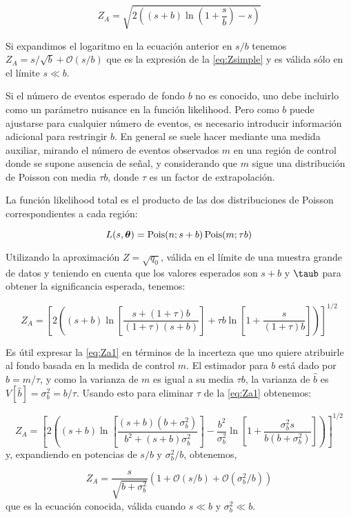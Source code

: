 \begin{equation}
  Z_A = \sqrt{2\left( (s+b) \ln \left( 1 + \frac{s}{b}\right) - s \right)}
  \label{eq:Z}
\end{equation}

Si expandimos el logaritmo en la ecuación anterior en $s/b$ tenemos $Z_A =
s/\sqrt{b} + \mathcal{O}(s/b)$ que es la expresión de la \cref{eq:Zsimple}
y es válida sólo en el límite $s \ll b$.

Si el número de eventos esperado de fondo $b$ no es conocido, uno debe incluirlo
como un parámetro nuisance en la función likelihood. Pero como $b$ puede
ajustarse para cualquier número de eventos, es necesario introducir información
adicional para restringir $b$. En general se suele hacer mediante una medida
auxiliar, mirando el número de eventos observados $m$ en una región de control
donde se supone ausencia de señal, y considerando que $m$ sigue
una distribución de Poisson con media $\tau b$, donde $\tau$ es un factor de
extrapolación.

La función likelihood total es el producto de las dos distribuciones de Poisson
correspondientes a cada región:

\begin{equation}
  L(s, \bm{\theta}) = \operatorname{Pois} (n;s+b) \operatorname{Pois}(m;\tau b)
\end{equation}

Utilizando la aproximación $Z = \sqrt{q_0}$, válida en el límite de una muestra
grande de datos y teniendo en cuenta que los valores esperados son $s+b$ y $\taub$
para obtener la significancia esperada, tenemos:

\begin{equation}
  Z_A = \left[ 2 \left( (s+b) \ln \left[ \frac{s+(1+\tau)b}{(1+\tau)(s+b)}
      \right] + \tau b \ln \left[ 1 + \frac{s}{(1+\tau)b} \right] \right)
    \right]^{1/2}
  \label{eq:Za1}
\end{equation}

Es útil expresar la \cref{eq:Za1} en términos de la incerteza que uno
quiere atribuirle al fondo basada en la medida de control $m$. El estimador
para $b$ está dado por $\hat{b} = m/\tau$, y como la varianza de $m$ es igual a
su media $\tau b$, la varianza de $\hat{b}$ es $V[\hat{b}] = \sigma_b^2 =
b/\tau$. Usando esto para eliminar $\tau$ de la \cref{eq:Za1}
obtenemos:

\begin{equation}
  Z_A = \left[ 2 \left( (s+b) \ln \left[
      \frac{(s+b)(b+\sigma_b^2)}{b^2+(s+b)\sigma_b^2} \right] -
    \frac{b^2}{\sigma_b^2} \ln \left[ 1 + \frac{\sigma_b^2 s}{b(b+\sigma_b^2)}
      \right] \right) \right]^{1/2}
  \label{eq:Za}
\end{equation}
%
y, expandiendo en potencias de $s/b$ y $\sigma_b^2/b$, obtenemos,

\begin{equation}
  Z_A = \frac{s}{\sqrt{b+\sigma_b^2}} \left( 1 + \mathcal{O}(s/b) + \mathcal{O}(\sigma_b^2/b) \right)
\end{equation}
%
que es la ecuación conocida, válida cuando $s\ll b$ y $\sigma_b^2 \ll b$.
